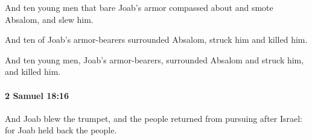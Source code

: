 			\begin{versebox}
					\item[BHS] 
					\item[ASV] And ten young men that bare Joab's armor compassed about and smote Absalom, and slew him.
					\item[NIV] And ten of Joab’s armor-bearers surrounded Absalom, struck him and killed him.
					\item[NRSV] And ten young men, Joab’s armor-bearers, surrounded Absalom and struck him, and killed him.
			\end{versebox}

		\paragraph{2 Samuel 18:16} %
			\label{2SAMUEL-18-16}

			And Joab blew the trumpet, and the people returned from pursuing after Israel: for Joab held back the people.

